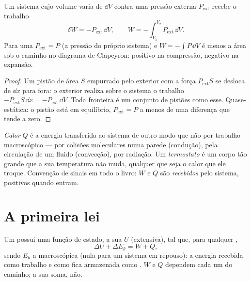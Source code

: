 \begin{proposition}\label{prop:b1:first-law:work}
Um sistema cujo volume varia de $\dd V$ contra uma pressão externa
$P_{\mathrm{ext}}$ recebe o trabalho
\[
\delta W = -P_{\mathrm{ext}}\,\dd V, \qquad
W = -\int_{V_1}^{V_2}P_{\mathrm{ext}}\,\dd V .
\]
Para uma  $P_{\mathrm{ext}} = P$ (a pressão do
próprio sistema) e $W = -\int P\,\dd V$ é menos a área sob o caminho no
diagrama de Clapeyron: positivo na compressão, negativo na expansão.
\end{proposition}

\begin{proof}
Um pistão de área $S$ empurrado pelo exterior com a força
$P_{\mathrm{ext}}S$ se desloca de $\dd x$ para fora: o exterior realiza sobre o
sistema o trabalho $-P_{\mathrm{ext}}S\,\dd x = -P_{\mathrm{ext}}\,\dd V$. Toda
fronteira é um conjunto de pistões como esse. Quase-estática: o pistão está
em equilíbrio, $P_{\mathrm{ext}} = P$ a menos de uma diferença que tende a zero.
\end{proof}

\begin{definition}[Calor]\label{def:b1:first-law:heat}
\emph{Calor} $Q$ é a energia transferida ao sistema de outro modo que não
por trabalho macroscópico --- por colisões moleculares numa parede
(condução), pela circulação de um fluido (convecção), por radiação. Um
\emph{termostato} é um corpo tão grande que a sua temperatura não muda,
qualquer que seja o calor que ele troque. Convenção de sinais em todo o
livro: $W$ e $Q$ são \emph{recebidos} pelo sistema, positivos quando entram.
\end{definition}

\section{A primeira lei}

\begin{theorem}\label{thm:b1:first-law:firstlaw}
Um  possui uma função de estado, a sua \emph{}
$U$ (extensiva), tal que, para qualquer ,
\[
\Delta U + \Delta E_{k} = W + Q ,
\]
sendo $E_k$ a  macroscópica (nula para um sistema em
repouso): a energia recebida como trabalho e como  fica armazenada como
. $W$ e $Q$ dependem cada um do caminho; a sua soma, não.
\end{theorem}
\admitted

